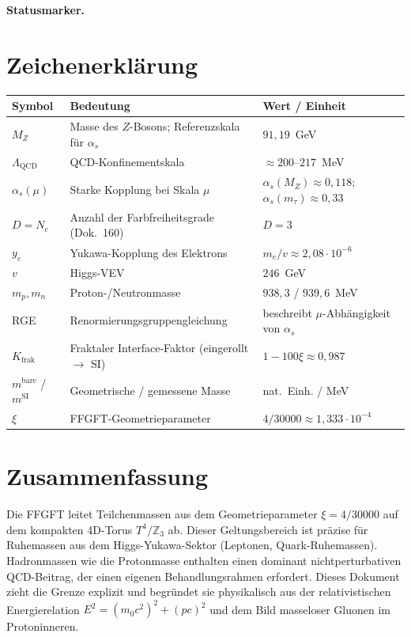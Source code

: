 
\medskip\noindent\textbf{Statusmarker.}


\section*{Zeichenerklärung}

\begin{center}
\begin{tabular}{lll}
\toprule
Symbol & Bedeutung & Wert / Einheit \\
\midrule
$M_Z$ & Masse des $Z$-Bosons; Referenzskala für $\alpha_s$ & $91{,}19$~GeV \\
$\Lambda_{\mathrm{QCD}}$ & QCD-Konfinementskala & $\approx 200$--$217$~MeV \\
$\alpha_s(\mu)$ & Starke Kopplung bei Skala $\mu$ & $\alpha_s(M_Z) \approx 0{,}118$; $\alpha_s(m_\tau) \approx 0{,}33$ \\
$D = N_c$ & Anzahl der Farbfreiheitsgrade (Dok.~160) & $D = 3$ \\
$y_e$ & Yukawa-Kopplung des Elektrons & $m_e/v \approx 2{,}08 \cdot 10^{-6}$ \\
$v$ & Higgs-VEV & $246$~GeV \\
$m_p, m_n$ & Proton-/Neutronmasse & $938{,}3$ / $939{,}6$~MeV \\
RGE & Renormierungsgruppengleichung & beschreibt $\mu$-Abhängigkeit von $\alpha_s$ \\
$K_{\text{frak}}$ & Fraktaler Interface-Faktor (eingerollt $\to$ SI) & $1-100\xi \approx 0{,}987$ \\
$m^{\text{bare}}$ / $m^{\text{SI}}$ & Geometrische / gemessene Masse & nat.~Einh. / MeV \\
$\xi$ & FFGFT-Geometrieparameter & $4/30000 \approx 1{,}333 \cdot 10^{-4}$ \\
\bottomrule
\end{tabular}
\end{center}

\section*{Zusammenfassung}

Die FFGFT leitet Teilchenmassen aus dem Geometrieparameter
$\xi = 4/30000$ auf dem kompakten 4D-Torus $T^4/\mathbb{Z}_3$ ab.
Dieser Geltungsbereich ist präzise für Ruhemassen aus dem
Higgs-Yukawa-Sektor (Leptonen, Quark-Ruhemassen). Hadronmassen wie die
Protonmasse enthalten einen dominant nichtperturbativen QCD-Beitrag,
der einen eigenen Behandlungsrahmen erfordert. Dieses Dokument zieht
die Grenze explizit und begründet sie physikalisch aus der
relativistischen Energierelation $E^2 = (m_0 c^2)^2 + (pc)^2$ und dem
Bild masseloser Gluonen im Protoninneren.

